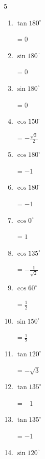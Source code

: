 \begin{multicols}{5}
\begin{enumerate}
  \item $\displaystyle \tan{180^\circ}$

        $\displaystyle =0$

  \item $\displaystyle \sin{180^\circ}$

        $\displaystyle =0$

  \item $\displaystyle \sin{180^\circ}$

        $\displaystyle =0$

  \item $\displaystyle \cos{150^\circ}$

        $\displaystyle =-\frac{\sqrt{3}}{2}$

  \item $\displaystyle \cos{180^\circ}$

        $\displaystyle =-1$

  \item $\displaystyle \cos{180^\circ}$

        $\displaystyle =-1$

  \item $\displaystyle \cos{0^\circ}$

        $\displaystyle =1$

\columnbreak %

  \item $\displaystyle \cos{135^\circ}$

        $\displaystyle =-\frac{1}{\sqrt{2}}$

  \item $\displaystyle \cos{60^\circ}$

        $\displaystyle =\frac{1}{2}$

  \item $\displaystyle \sin{150^\circ}$

        $\displaystyle =\frac{1}{2}$

  \item $\displaystyle \tan{120^\circ}$

        $\displaystyle =-\sqrt{3}$

  \item $\displaystyle \tan{135^\circ}$

        $\displaystyle =-1$

  \item $\displaystyle \tan{135^\circ}$

        $\displaystyle =-1$

  \item $\displaystyle \sin{120^\circ}$


\end{enumerate}
\end{multicols}
